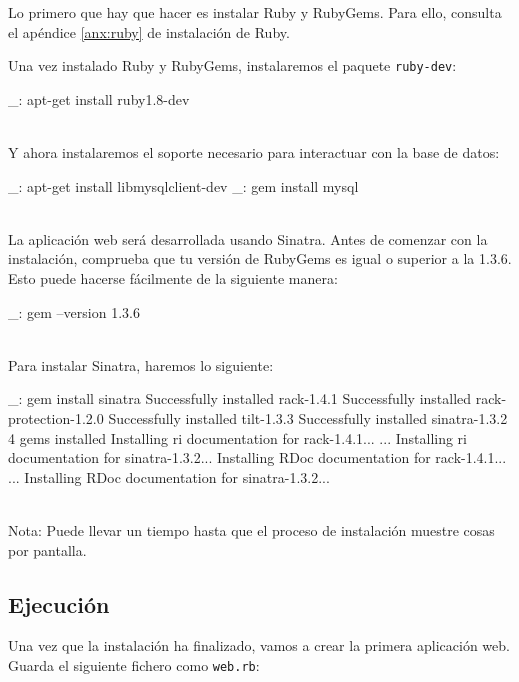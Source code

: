 Lo primero que hay que hacer es instalar Ruby y RubyGems. Para ello, consulta el apéndice \ref{anx:ruby} de instalación de Ruby.

Una vez instalado Ruby y RubyGems, instalaremos el paquete \texttt{ruby-dev}:

\begin{bashcode}
_: apt-get install ruby1.8-dev
\end{bashcode}
\\

Y ahora instalaremos el soporte necesario para interactuar con la base de datos:

\begin{bashcode}
_: apt-get install libmysqlclient-dev
_: gem install mysql
\end{bashcode}
\\

La aplicación web será desarrollada usando Sinatra. Antes de comenzar con la instalación, comprueba que tu versión de RubyGems es igual o superior a la 1.3.6. Esto puede hacerse fácilmente de la siguiente manera:

\begin{bashcode}
_: gem --version
1.3.6
\end{bashcode}
\\

Para instalar Sinatra, haremos lo siguiente:

\begin{bashcode}
_: gem install sinatra
Successfully installed rack-1.4.1
Successfully installed rack-protection-1.2.0
Successfully installed tilt-1.3.3
Successfully installed sinatra-1.3.2
4 gems installed
Installing ri documentation for rack-1.4.1...
...
Installing ri documentation for sinatra-1.3.2...
Installing RDoc documentation for rack-1.4.1...
...
Installing RDoc documentation for sinatra-1.3.2...
\end{bashcode}
\\

Nota: Puede llevar un tiempo hasta que el proceso de instalación muestre cosas por pantalla.


\subsection{Ejecución}

Una vez que la instalación ha finalizado, vamos a crear la primera aplicación web. Guarda el siguiente fichero como \texttt{web.rb}:

